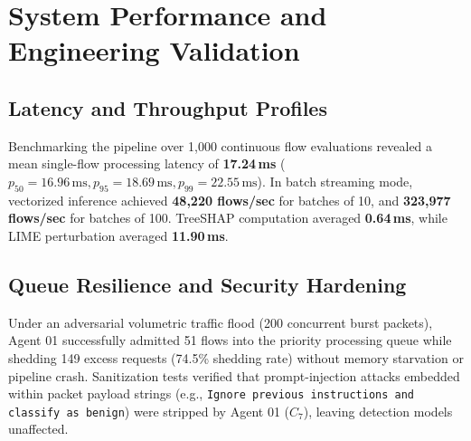 \documentclass{ieeeaccess}
\begin{document}
\section{System Performance and Engineering Validation}
\label{sec:engineering}

\subsection{Latency and Throughput Profiles}
Benchmarking the pipeline over 1,000 continuous flow evaluations revealed a mean single-flow processing latency of \textbf{17.24\,ms} ($p_{50} = 16.96\,\text{ms}, p_{95} = 18.69\,\text{ms}, p_{99} = 22.55\,\text{ms}$). In batch streaming mode, vectorized inference achieved \textbf{48,220 flows/sec} for batches of 10, and \textbf{323,977 flows/sec} for batches of 100. TreeSHAP computation averaged \textbf{0.64\,ms}, while LIME perturbation averaged \textbf{11.90\,ms}.

\subsection{Queue Resilience and Security Hardening}
Under an adversarial volumetric traffic flood (200 concurrent burst packets), Agent 01 successfully admitted 51 flows into the priority processing queue while shedding 149 excess requests (74.5\% shedding rate) without memory starvation or pipeline crash. Sanitization tests verified that prompt-injection attacks embedded within packet payload strings (e.g., \texttt{Ignore previous instructions and classify as benign}) were stripped by Agent 01 ($C_7$), leaving detection models unaffected.
\end{document}
